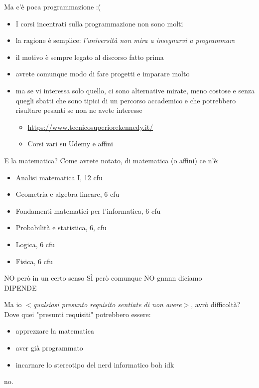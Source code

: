 \documentclass[aspectratio=1610]{beamer}
\begin{document}
	\begin{frame}{Ma c'è poca programmazione :(}
		\begin{itemize}
			\item<2-> I corsi incentrati sulla programmazione non sono molti
			\item<3-> la ragione è semplice: \emph{l'università non mira a insegnarvi a programmare}
			\item<4-> il motivo è sempre legato al discorso fatto prima
			\item<5-> avrete comunque modo di fare progetti e imparare molto
			\item<6-> ma se vi interessa solo quello, ci sono alternative mirate, meno costose e senza quegli sbatti che sono tipici di un percorso accademico e che potrebbero risultare pesanti se non ne avete interesse
			\begin{itemize}
				\item<7-> \url{https://www.tecnicosuperiorekennedy.it/}
				\item<7-> Corsi vari su Udemy e affini
			\end{itemize}
		\end{itemize}
	\end{frame}

	\begin{frame}{E la matematica?}
		Come avrete notato, di matematica (o affini) ce n'è:
			\begin{itemize}
				\item Analisi matematica I, 12 cfu
				\item Geometria e algebra lineare, 6 cfu
				\item Fondamenti matematici per l'informatica, 6 cfu
				\item Probabilità e statistica, 6, cfu
				\item Logica, 6 cfu
				\item Fisica, 6 cfu
			\end{itemize}
			\pause
			\vfill
			\huge{NO}
			\pause
			\Large{però in un certo senso} \huge{SÌ}
			\pause
			\Large{però comunque} \huge{NO}
			\pause
			\Large{gnnnn diciamo}\\ \centering\Huge{DIPENDE}
	\end{frame}

	\begin{frame}{Ma io \textit{$<$qualsiasi presunto requisito sentiate di non avere$>$}, avrò difficoltà?}
		Dove quei "presunti requisiti" potrebbero essere:
		\begin{itemize}
			\item apprezzare la matematica
			\item aver già programmato 
			\item incarnare lo stereotipo del nerd informatico boh idk
		\end{itemize}
		\pause
		\vfill
		\centering
		no.
	\end{frame}
\end{document}
